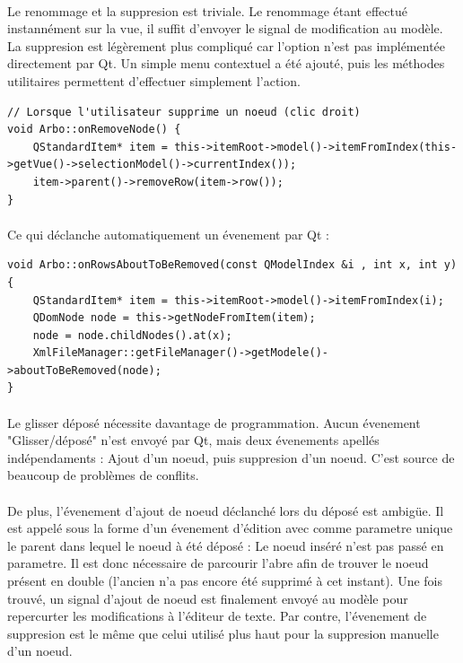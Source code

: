 \paragraph{}
Le renommage et la suppresion est triviale. Le renommage étant effectué instannément sur la vue, il suffit d'envoyer le signal de modification au modèle. La suppresion est légèrement plus compliqué car l'option n'est pas implémentée directement par Qt. Un simple menu contextuel a été ajouté, puis les méthodes utilitaires permettent d'effectuer simplement l'action.

\begin{lstlisting}
// Lorsque l'utilisateur supprime un noeud (clic droit)
void Arbo::onRemoveNode() {
    QStandardItem* item = this->itemRoot->model()->itemFromIndex(this->getVue()->selectionModel()->currentIndex());
    item->parent()->removeRow(item->row());
}
\end{lstlisting}

\paragraph{}
Ce qui déclanche automatiquement un évenement par Qt :
\begin{lstlisting}
void Arbo::onRowsAboutToBeRemoved(const QModelIndex &i , int x, int y)
{
    QStandardItem* item = this->itemRoot->model()->itemFromIndex(i);
    QDomNode node = this->getNodeFromItem(item);
    node = node.childNodes().at(x);
    XmlFileManager::getFileManager()->getModele()->aboutToBeRemoved(node);
}
\end{lstlisting}

\paragraph{}
Le glisser déposé nécessite davantage de programmation. Aucun évenement "Glisser/déposé" n'est envoyé par Qt, mais deux évenements apellés indépendaments : Ajout d'un noeud, puis suppresion d'un noeud. C'est source de beaucoup de problèmes de conflits.

\paragraph{}
De plus, l'évenement d'ajout de noeud déclanché lors du déposé est ambigüe. Il est appelé sous la forme d'un évenement d'édition avec comme parametre unique le parent dans lequel le noeud à été déposé : Le noeud inséré n'est pas passé en parametre.
Il est donc nécessaire de parcourir l'abre afin de trouver le noeud présent en double (l'ancien n'a pas encore été supprimé à cet instant). Une fois trouvé, un signal d'ajout de noeud est finalement envoyé au modèle pour repercurter les modifications à l'éditeur de texte.
Par contre, l'évenement de suppresion est le même que celui utilisé plus haut pour la suppresion manuelle d'un noeud.


